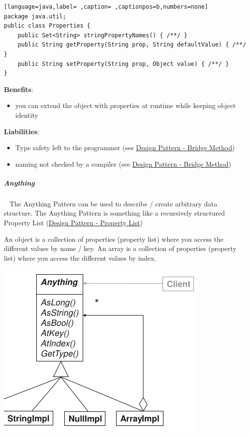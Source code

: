 \documentclass[11pt,twoside,landscape]{article}
\begin{document}
\begin{multicols}{3}
\begin{lstlisting}[language=java,label= ,caption= ,captionpos=b,numbers=none]
package java.util;
public class Properties {
    public Set<String> stringPropertyNames() { /**/ }
    public String getProperty(String prop, String defaultValue) { /**/ }
    public String setProperty(String prop, Object value) { /**/ }
}
\end{lstlisting}


\textbf{Benefits}:
\begin{itemize}
\item you can extend the object with properties at runtime while keeping object identity
\end{itemize}


\textbf{Liabilities}:
\begin{itemize}
\item Type safety left to the programmer (see \href{../../../roam/20230115180651-design_pattern_bridge_method.org}{Design Pattern - Bridge Method})
\item naming not checked by a compiler (see \href{../../../roam/20230115180651-design_pattern_bridge_method.org}{Design Pattern - Bridge Method})
\end{itemize}
\subparagraph{Anything} \
\label{sec:orgd30fcad}
The Anything Pattern can be used to describe / create arbitrary data structure.
The Anything Pattern is something like a recursively structured Property List (\href{../../../roam/20230115171958-design_pattern_property_list.org}{Design Pattern - Property List})

An object is a collection of properties (property list) where you access the different values by name / key.
An array is a collection of properties (property list) where you access the different values by index.


{
\begin{center}
\includegraphics[width=.9\linewidth]{img/anything_pattern.png}
\end{center}
\label{fig:anything-class-diagram}
}

\end{multicols}
\end{document}
